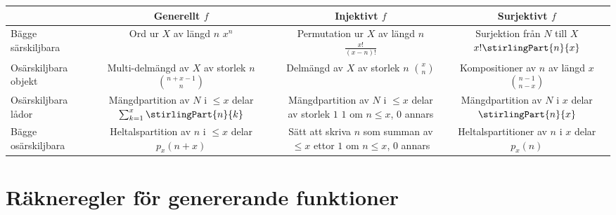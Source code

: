 \documentclass[nobib]{tufte-handout}
\begin{document}
\begin{fullwidth}
  \begin{tabularx}{\linewidth}{l|ccc}
    & Generellt $f$ & Injektivt $f$ & Surjektivt $f$\\
    \midrule
    Bägge särskiljbara & \specialcell{Ord ur $X$ av längd $n$\\ $x^n$} & \specialcell{Permutation ur $X$ av längd $n$\\ $\frac{x!}{(x-n)!}$} & \specialcell{Surjektion från $N$ till $X$\\$x!\stirlingPart{n}{x}$} \\
    Osärskiljbara objekt & \specialcell{Multi-delmängd av $X$\\ av storlek $n$\\$\binom{n + x - 1}{n}$} & \specialcell{Delmängd av $X$ av storlek $n$\\$\binom{x}{n}$} & \specialcell{Kompositioner av $n$\\av längd $x$\\$\binom{n - 1}{n - x}$} \\
    Osärskiljbara lådor & \specialcell{Mängdpartition av $N$\\ i $\leq x$ delar \\$\sum_{k=1}^{x} \stirlingPart{n}{k}$} & \specialcell{Mängdpartition av $N$\\ i $\leq x$ delar av storlek $1$\\$1$ om $n \leq x$, $0$ annars} & \specialcell{Mängdpartition av $N$\\i $x$ delar\\$\stirlingPart{n}{x}$} \\
    Bägge osärskiljbara & \specialcell{Heltalspartition av $n$ i $\leq x$ delar\\$p_x(n + x)$} & \specialcell{Sätt att skriva $n$ som\\summan av $\leq x$ ettor\\$1$ om $n \leq x$, $0$ annars} & \specialcell{Heltalspartitioner av $n$\\ i $x$ delar \\$p_x(n)$} 
  \end{tabularx}
\end{fullwidth}

\section{Räkneregler för genererande funktioner}
\end{document}
